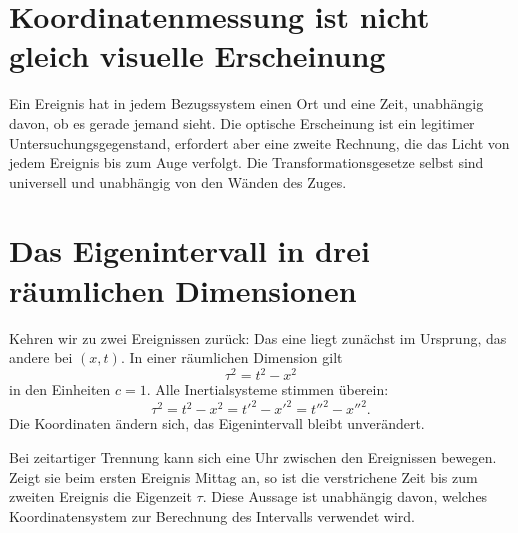 \section{Koordinatenmessung ist nicht gleich visuelle Erscheinung}

\begin{classroomqa}
\end{classroomqa}

Ein Ereignis hat in jedem Bezugssystem einen Ort und eine Zeit, unabhängig davon, ob es gerade jemand sieht. Die optische Erscheinung ist ein legitimer Untersuchungsgegenstand, erfordert aber eine zweite Rechnung, die das Licht von jedem Ereignis bis zum Auge verfolgt. Die Transformationsgesetze selbst sind universell und unabhängig von den Wänden des Zuges.

\section{Das Eigenintervall in drei räumlichen Dimensionen}

Kehren wir zu zwei Ereignissen zurück: Das eine liegt zunächst im Ursprung, das andere bei \((x,t)\). In einer räumlichen Dimension gilt
\begin{equation}
\tau^2=t^2-x^2
\label{eq:sr2-interval-1d}
\end{equation}
in den Einheiten \(c=1\). Alle Inertialsysteme stimmen überein:
\begin{equation}
\tau^2
=t^2-x^2
=t'^2-x'^2
=t''^2-x''^2.
\end{equation}
Die Koordinaten ändern sich, das Eigenintervall bleibt unverändert.

Bei zeitartiger Trennung kann sich eine Uhr zwischen den Ereignissen bewegen. Zeigt sie beim ersten Ereignis Mittag an, so ist die verstrichene Zeit bis zum zweiten Ereignis die Eigenzeit \(\tau\). Diese Aussage ist unabhängig davon, welches Koordinatensystem zur Berechnung des Intervalls verwendet wird.

